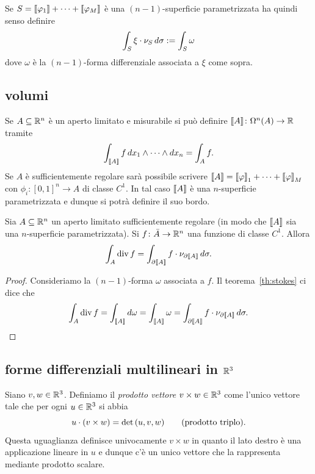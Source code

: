 Se $S = {\left\llbracket \varphi_1 \right\rrbracket} + \dots + {\left\llbracket \varphi_M \right\rrbracket}$ è una $(n-1)$-superficie parametrizzata 
ha quindi senso definire 
\[
   \int_S \xi \cdot \nu_S\, d\sigma := \int_S \omega
\]
dove $\omega$ è la $(n-1)$-forma differenziale associata a $\xi$ come sopra.

\subsection{volumi}

Se $A\subseteq {\mathbb R}^n$ è un aperto limitato e misurabile si può definire ${\left\llbracket A \right\rrbracket}\colon \Omega^n(A) \to {\mathbb R}$ tramite
\[
  \int_{{\left\llbracket A \right\rrbracket}} f \, dx_1 \wedge \dots \wedge dx_n 
  = \int_A f.
\]
Se $A$ è sufficientemente regolare sarà possibile scrivere 
${\left\llbracket A \right\rrbracket} = {\left\llbracket \varphi \right\rrbracket}_1 + \dots + {\left\llbracket \varphi \right\rrbracket}_M$ 
con $\phi_i\colon [0,1]^n \to A$ di classe $C^1$. 
In tal caso ${\left\llbracket A \right\rrbracket}$ è una $n$-superficie parametrizzata e dunque si potrà definire il suo 
bordo. 

\begin{theorem}
Sia $A\subseteq {\mathbb R}^n$ un aperto limitato sufficientemente regolare (in modo che ${\left\llbracket A \right\rrbracket}$ sia una $n$-superficie parametrizzata).
Si $f\colon \bar A \to {\mathbb R}^n$ una funzione di classe $C^1$.
Allora 
\[
   \int_A \operatorname{div} f = \int_{\partial {\left\llbracket A \right\rrbracket}} f \cdot \nu_{\partial {\left\llbracket A \right\rrbracket}}\, d\sigma.
\]
\end{theorem}
\begin{proof}
Consideriamo la $(n-1)$-forma $\omega$ associata a $f$.
Il teorema~\ref{th:stokes} ci dice che 
\[
  \int_{A} \operatorname{div} f
  = \int_{{\left\llbracket A \right\rrbracket}} d\omega 
  = \int_{{\left\llbracket A \right\rrbracket}} \omega
  = \int_{\partial {\left\llbracket A \right\rrbracket}} f \cdot \nu_{\partial {\left\llbracket A \right\rrbracket}}\, d\sigma.
\]
\end{proof}

\subsection{forme differenziali multilineari in ${\mathbb R}^3$}

\begin{definition}
  \label{def:prodotto_vettore}
Siano $v,w\in {\mathbb R}^3$.
Definiamo il \emph{prodotto vettore} $v\times w\in {\mathbb R}^3$ 
come l'unico vettore tale che per ogni $u\in {\mathbb R}^3$ si abbia
\[
  u \cdot (v\times w) = \det{\left( u, v, w \right)} \qquad\text{(prodotto triplo)}.
\]
Questa uguaglianza definisce univocamente $v\times w$ in quanto 
il lato destro è una applicazione lineare in $u$ e dunque 
c'è un unico vettore che la rappresenta mediante prodotto scalare.
\end{definition}

